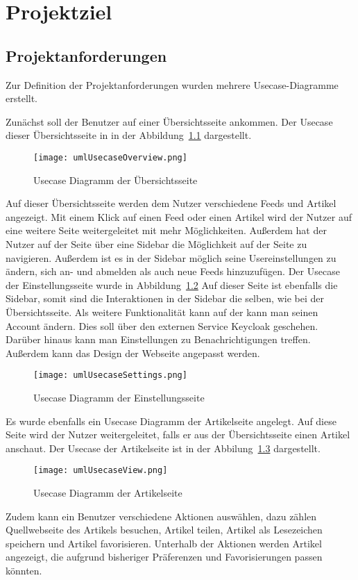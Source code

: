 
\chapter{Projektziel}

\section{Projektanforderungen}
Zur Definition der Projektanforderungen wurden mehrere Usecase-Diagramme erstellt.

Zunächst soll der Benutzer auf einer Übersichtsseite ankommen.
Der Usecase dieser Übersichtsseite in in der Abbildung~\ref{fig:usecaseOverview} dargestellt.
\begin{figure}
    \texttt{[image: umlUsecaseOverview.png]}
    \caption{Usecase Diagramm der Übersichtsseite}
    \label{fig:usecaseOverview}
\end{figure}
Auf dieser Übersichtsseite werden dem Nutzer verschiedene Feeds und Artikel angezeigt. Mit einem Klick auf einen Feed oder einen Artikel wird
der Nutzer auf eine weitere Seite weitergeleitet mit mehr Möglichkeiten. Außerdem hat der Nutzer auf der Seite über eine Sidebar die Möglichkeit
auf der Seite zu navigieren. Außerdem ist es in der Sidebar möglich seine Usereinstellungen zu ändern, sich an- und abmelden als auch neue Feeds
hinzuzufügen. Der Usecase der Einstellungsseite wurde in Abbildung~\ref{fig:usecaseSettings}
Auf dieser Seite ist ebenfalls die Sidebar, somit sind die Interaktionen in der Sidebar die selben, wie
bei der Übersichtsseite. Als weitere Funktionalität kann auf der kann man seinen Account
ändern. Dies soll über den externen Service Keycloak geschehen. Darüber hinaus
kann man Einstellungen zu Benachrichtigungen treffen. Außerdem kann das Design der
Webseite angepasst werden.
\begin{figure}
    \texttt{[image: umlUsecaseSettings.png]}
    \caption{Usecase Diagramm der Einstellungsseite}
    \label{fig:usecaseSettings}
\end{figure}
Es wurde ebenfalls ein Usecase Diagramm der Artikelseite angelegt. Auf diese Seite
wird der Nutzer weitergeleitet, falls er aus der Übersichtsseite einen Artikel anschaut.
Der Usecase der Artikelseite ist in der Abbilung~\ref{fig:usecaseView} dargestellt.
\begin{figure}
    \texttt{[image: umlUsecaseView.png]}
    \caption{Usecase Diagramm der Artikelseite}
    \label{fig:usecaseView}
\end{figure}
Zudem kann ein Benutzer verschiedene Aktionen auswählen, dazu zählen Quellwebseite des Artikels besuchen, Artikel teilen, Artikel als 
Lesezeichen speichern und Artikel favorisieren. Unterhalb der Aktionen werden Artikel angezeigt, die aufgrund bisheriger Präferenzen und 
Favorisierungen passen könnten.


